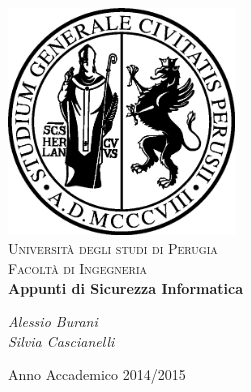 \documentclass [4pt,a4paper,oneside,openany]{book} %
\begin{document}

\begin{titlepage}
 \begin{center}
     \includegraphics[width=6cm]{Immagini/logo.png}\\ %
     \vspace{1em}
     {\Large \textsc{Universit\`a degli studi di Perugia}}\\
     \vspace{1em}
     {\Large \textsc{Facolt\`a di Ingegneria}}\\
     \vspace{5em}
     {\LARGE \textbf{Appunti di Sicurezza Informatica}}\\
 \end{center}
 
 \vskip 2.5cm
  \begin{center}
	\Large{\textit{Alessio Burani}}\\
	\Large{\textit{Silvia Cascianelli}}\\[0.4cm]
  \end{center}

\vskip 2.5cm
\begin{center}
{\normalsize Anno Accademico 2014/2015}
\end{center}
\end{titlepage}


\pagestyle{fancy}
\renewcommand{\chaptermark} [1]{\chaptername\ \thechapter.\ #1}{} 
\renewcommand{\chaptermark}[1]{\markboth{\thechapter.\ #1}{}} 
\renewcommand{\sectionmark}[1]{\markright{\thesection\ #1}}
\fancyhf{}
\fancyhead[LE,RO]{\bfseries\thepage} 
\fancyhead[LO,RE]{\bfseries\leftmark} 

\tableofcontents


 
 
 




\normalsize
\newpage


\end{document}
